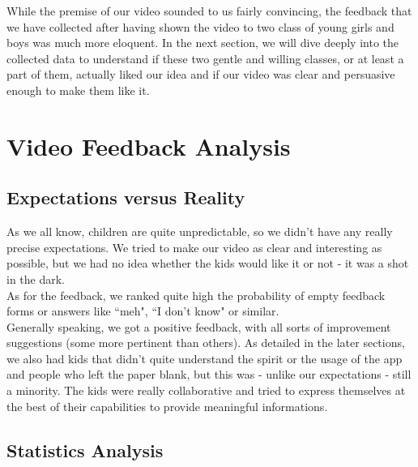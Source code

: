\documentclass[12pt]{scrartcl}
\begin{document}
	While the premise of our video sounded to us fairly convincing, the feedback that we have collected after having shown the video to two class of young girls and boys was much more eloquent. In the next section, we will dive deeply into the collected data to understand if these two gentle and willing classes, or at least a part of them, actually liked our idea and if our video was clear and persuasive enough to make them like it. 
  
\newpage


\section{Video Feedback Analysis}
	
	
	\subsection{Expectations versus Reality}
	
		
		As we all know, children are quite unpredictable, so we didn't have any really precise expectations. We tried to make our video as clear and interesting as possible, but we had no idea whether the kids would like it or not - it was a shot in the dark.\\
		As for the feedback, we ranked quite high the probability of empty feedback forms or answers like ``meh", ``I don't know" or similar.\\
		Generally speaking, we got a positive feedback, with all sorts of improvement suggestions (some more pertinent than others). As detailed in the later sections, we also had kids that didn't quite understand the spirit or the usage of the app and people who left the paper blank, but this was - unlike our expectations - still a minority. The kids were really collaborative and tried to express themselves at the best of their capabilities to provide meaningful informations.
		
	
	\subsection{Statistics Analysis}
	
		
\end{document}
